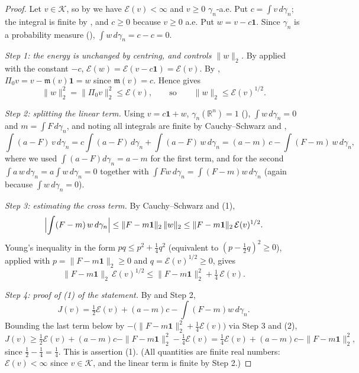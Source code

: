 \begin{proof}
Let $v \in \mathcal{K}$, so by  we have
$\mathcal{E}(v) < \infty$ and $v \geq 0$ $\gamma_n$-a.e.  Put
$c = \int v \, d\gamma_n$; the integral is finite by , and
$c \geq 0$ because $v \geq 0$ a.e.  Put $w = v - c\mathbf{1}$.  Since $\gamma_n$
is a probability measure (),
$\int w\, d\gamma_n = c - c = 0$.

\emph{Step 1: the energy is unchanged by centring, and controls $\|w\|_2$.}
By  applied with the constant $-c$,
$\mathcal{E}(w) = \mathcal{E}(v - c\mathbf{1}) = \mathcal{E}(v)$.  By
, $\Pi_0 v = v - \mathfrak{m}(v)\mathbf{1} = w$ since
$\mathfrak{m}(v) = c$.  Hence  gives
\begin{equation*}
  \|w\|_2^2 = \|\Pi_0 v\|_2^2 \leq \mathcal{E}(v),
  \qquad\text{so}\qquad
  \|w\|_2 \leq \mathcal{E}(v)^{1/2} . \tag{1}
\end{equation*}

\emph{Step 2: splitting the linear term.}
Using $v = c\mathbf{1} + w$, $\gamma_n(\mathbb{R}^n) = 1$
(), $\int w\,d\gamma_n = 0$ and $m = \int F\,d\gamma_n$, and
noting all integrals are finite by Cauchy--Schwarz and ,
\[
  \int (a-F)\,v \, d\gamma_n
    = c\int (a-F)\, d\gamma_n + \int (a-F)\,w\, d\gamma_n
    = (a-m)\,c - \int (F - m)\,w\, d\gamma_n ,
\]
where we used $\int (a - F)d\gamma_n = a - m$ for the first term, and for the
second $\int a\,w\,d\gamma_n = a\int w \, d\gamma_n = 0$ together with
$\int F w \, d\gamma_n = \int (F - m)w\, d\gamma_n$ (again because
$\int w\,d\gamma_n = 0$).

\emph{Step 3: estimating the cross term.}
By Cauchy--Schwarz and (1),
\[
  \Bigl|\int (F-m)\,w \, d\gamma_n\Bigr|
    \leq \|F - m\mathbf{1}\|_2\, \|w\|_2
    \leq \|F - m\mathbf{1}\|_2\, \mathcal{E}(v)^{1/2} .
\]
Young's inequality in the form $pq \leq p^2 + \tfrac14 q^2$ (equivalent to
$(p - \tfrac12 q)^2 \geq 0$), applied with $p = \|F-m\mathbf{1}\|_2 \geq 0$ and
$q = \mathcal{E}(v)^{1/2} \geq 0$, gives
\begin{equation*}
  \|F-m\mathbf{1}\|_2\,\mathcal{E}(v)^{1/2}
    \leq \|F-m\mathbf{1}\|_2^2 + \tfrac14\,\mathcal{E}(v) . \tag{2}
\end{equation*}

\emph{Step 4: proof of (1) of the statement.}
By  and Step 2,
\[
  J(v) = \tfrac12 \mathcal{E}(v) + (a-m)c - \int (F-m)w\, d\gamma_n .
\]
Bounding the last term below by $-\bigl(\|F-m\mathbf{1}\|_2^2 + \tfrac14\mathcal{E}(v)\bigr)$
via Step 3 and (2),
\[
  J(v) \geq \tfrac12\mathcal{E}(v) + (a-m)c
          - \|F-m\mathbf{1}\|_2^2 - \tfrac14\mathcal{E}(v)
       = \tfrac14\mathcal{E}(v) + (a-m)c - \|F-m\mathbf{1}\|_2^2 ,
\]
since $\tfrac12 - \tfrac14 = \tfrac14$.  This is assertion (1).  (All quantities
are finite real numbers: $\mathcal{E}(v) < \infty$ since $v \in \mathcal{K}$, and
the linear term is finite by Step 2.)


\end{proof}
